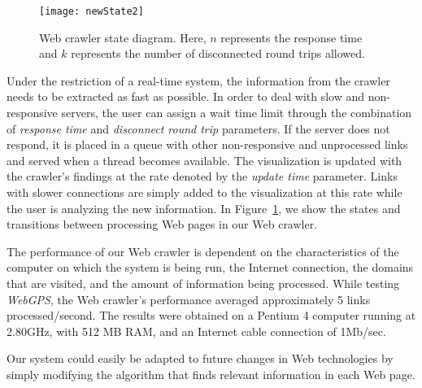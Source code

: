 \documentclass[10pt,psfig]{article}
\begin{document}
{\begin{figure}[t]
\centering
\texttt{[image: newState2]}
\caption{Web crawler state diagram. Here, $n$ represents the response time and $k$ represents the number of disconnected round trips allowed.}
\label{fig_state}
\end{figure}

Under the restriction of a real-time system, the information from the crawler needs to be extracted as fast as possible.
In order to deal with slow and non-responsive servers, the user can assign a wait time limit through the combination of {\em response time} and {\em disconnect round trip} parameters.
If the server does not respond, it is placed in a queue with other non-responsive and unprocessed links and served when a thread becomes available.
The visualization is updated with the crawler's findings at the rate denoted by the {\em update time} parameter.
Links with slower connections are simply added to the visualization at this rate while the user is analyzing the new information.
In Figure~\ref{fig_state}, we show the states and transitions between processing Web pages in our Web crawler.


The performance of our Web crawler is dependent on the characteristics of the computer on which the system is being run, the Internet connection, the domains that are visited, and the amount of information being processed.
While testing {\em WebGPS}, the Web crawler's performance averaged approximately 5 links processed/second.
The results were obtained on a Pentium 4 computer running at 2.80GHz, with 512 MB RAM, and an Internet cable connection of 1Mb/sec.

Our system could easily be adapted to future changes in Web technologies by simply modifying the algorithm that finds relevant information in each Web page.

}
\end{document}
